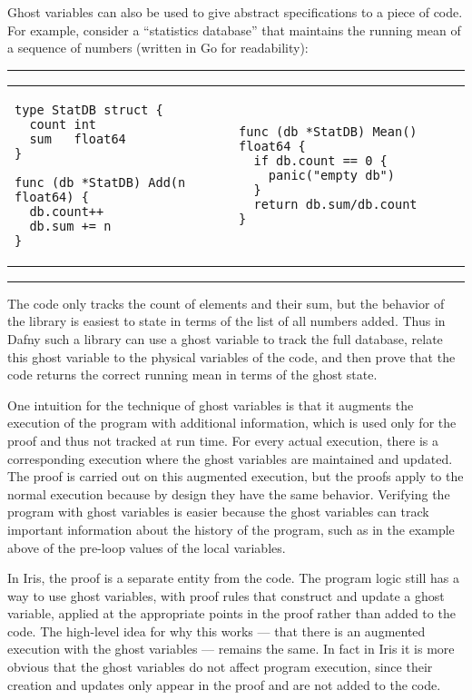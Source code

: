 \pagebreak[1]
Ghost variables can also be used to give abstract specifications to a piece of
code. For example, consider a ``statistics database'' that maintains the running
mean of a sequence of numbers (written in Go for readability):
\nopagebreak
\vspace{\baselineskip}
\hrule\nopagebreak
\vspace{-12pt}\nopagebreak
\noindent\begin{tabular}{p{} p{}}
\begin{verbatim}
type StatDB struct {
  count int
  sum   float64
}

func (db *StatDB) Add(n float64) {
  db.count++
  db.sum += n
}
\end{verbatim}
&
\begin{verbatim}
func (db *StatDB) Mean() float64 {
  if db.count == 0 {
    panic("empty db")
  }
  return db.sum/db.count
}
\end{verbatim}
\end{tabular}
\vspace{-8pt}
\hrule
\vspace{\baselineskip}

The code only tracks the count of elements and
their sum, but the behavior of the library is easiest to state in terms of the list of all
numbers added. Thus in Dafny such a library can use a ghost variable to track
the full database, relate this ghost variable to the physical variables
of the code, and then prove that the code returns the correct running mean in
terms of the ghost state.

One intuition for the technique of ghost variables is that it augments the
execution of the program with additional information, which is used only for the proof
and thus not tracked at run time. For every actual execution, there is a
corresponding execution where the ghost variables are maintained and updated.
The proof is carried out on this augmented execution,
but the proofs apply to the normal execution because by design they have the
same behavior. Verifying the program with ghost
variables is easier because the ghost variables can track important
information about the history of the program, such as in the example above of
the pre-loop values of the local variables.

In Iris, the proof is a separate entity from the code. The program logic still
has a way to use ghost variables, with proof rules that construct and update a
ghost variable, applied at the appropriate points in the proof rather than added
to the code. The high-level idea for why this works --- that there is an
augmented execution with the ghost variables ---
remains the same. In fact in Iris it is more obvious
that the ghost variables do not affect program execution, since their creation
and updates only appear in the proof and are not added to the code.

